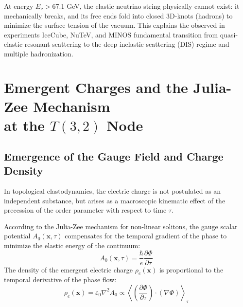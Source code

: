 \documentclass[12pt,a4paper]{article}
\begin{document}
		At energy $E_\nu > 67.1$ GeV, the elastic neutrino string physically cannot exist: it mechanically breaks, and its free ends fold into closed 3D-knots (hadrons) to minimize the surface tension of the vacuum. 
		This explains the observed in experiments IceCube, NuTeV, and MINOS fundamental transition from quasi-elastic resonant scattering to the deep inelastic scattering (DIS) regime and multiple hadronization.
		
		\section{Emergent Charges and the Julia-Zee Mechanism\\ at the $T(3,2)$ Node}
		
		\subsection{Emergence of the Gauge Field and Charge Density}
		In topological elastodynamics, the electric charge is not postulated as an independent substance, but arises as a macroscopic kinematic effect of the precession of the order parameter with respect to time $\tau$.
		
		According to the Julia-Zee mechanism for non-linear solitons, the gauge scalar potential $A_0(\mathbf{x}, \tau)$ compensates for the temporal gradient of the phase to minimize the elastic energy of the continuum:
		\begin{equation}
			A_0(\mathbf{x}, \tau) = \frac{\hbar}{e} \frac{\partial \Phi}{\partial \tau}
		\end{equation}
		The density of the emergent electric charge $\rho_e(\mathbf{x})$ is proportional to the temporal derivative of the phase flow:
		\begin{equation}
			\rho_e(\mathbf{x}) = \varepsilon_0 \nabla^2 A_0 \propto \left\langle \left( \frac{\partial \Phi}{\partial \tau} \right) \cdot (\nabla \Phi) \right\rangle_\tau
		\end{equation}
		
\end{document}
